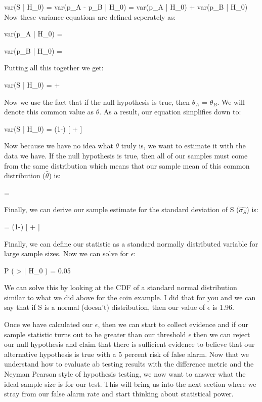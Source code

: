 \beq
var(S | H_0) = var(p_A - p_B | H_0) = var(p_A | H_0) + var(p_B | H_0) 
\eeq
Now these variance equations are defined seperately as: 

\beq
var(p_A | H_0) = 
\eeq

\beq
var(p_B | H_0) = 
\eeq

Putting all this together we get:

\beq
var(S | H_0) =  + 
\eeq

Now we use the fact that if the null hypothesis is true, then $\theta_A$ = $\theta_B$. We will denote this common
value as $\theta$. As a result, our equation simplifies down to:

\beq
var(S | H_0) = \theta(1-\theta) [ + ]
\eeq

Now because we have no idea what $\theta$ truly is, we want to estimate it with the data we have. If the null hypothesis is
true, then all of our samples must come from the same distribution which means that our sample mean of this common distribution
($\hat{\theta}$) is:

\beq
\hat{\theta} = 
\eeq

Finally, we can derive our sample estimate for the standard deviation of S ($\hat{\sigma_S}$) is:

\beq
{} = \hat{\theta}(1-\hat{\theta}) [ + ]
\eeq

Finally, we can define our statistic as a standard normally distributed variable for large sample sizes.
Now we can solve for $\epsilon$:

\beq
P (  > \epsilon | H_0 ) = 0.05
\eeq

We can solve this by looking at the CDF of a standard normal distribution similar to what we did above for the coin example.
I did that for you and we can say that if S is a normal (doesn't) distribution, then our value of $\epsilon$ is 1.96. 

Once we have calculated our $\epsilon$, then we can start to collect evidence and if our sample statistic turns out to be greater
than our threshold $\epsilon$ then we can reject our null hypothesis and claim that there is sufficient evidence to believe that
our alternative hypothesis is true with a 5 percent risk of false alarm. Now that we understand how to evaluate ab testing results
with the difference metric and the Neyman Pearson style of hypothesis testing, we now want to answer what the ideal sample size is 
for our test. This will bring us into the next section where we stray from our false alarm rate and start thinking about statistical
power.

